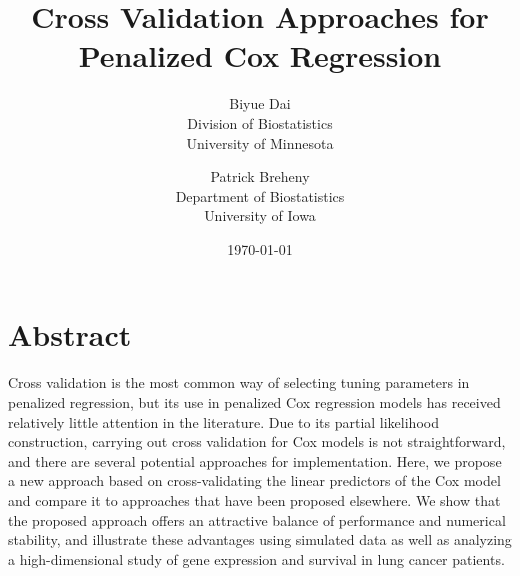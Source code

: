 \documentclass{article}
\title{Cross Validation Approaches for Penalized Cox Regression}
\author{Biyue Dai\\Division of Biostatistics\\University of Minnesota
  \and
  Patrick Breheny\\Department of Biostatistics\\University of Iowa}
\date{\today}
\begin{document}
\maketitle

\section*{Abstract}
Cross validation is the most common way of selecting tuning parameters in penalized regression, but its use in penalized Cox regression models has received relatively little attention in the literature. Due to its partial likelihood construction, carrying out cross validation for Cox models is not straightforward, and there are several potential approaches for implementation. Here, we propose a new approach based on cross-validating the linear predictors of the Cox model and compare it to approaches that have been proposed elsewhere. We show that the proposed approach offers an attractive balance of performance and numerical stability, and illustrate these advantages using simulated data as well as analyzing a high-dimensional study of gene expression and survival in lung cancer patients.





\end{document}
